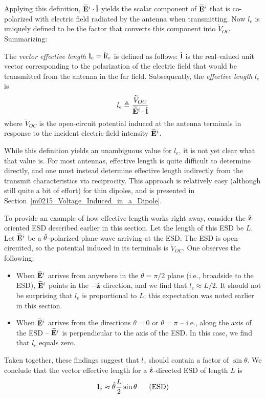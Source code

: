 Applying this definition, $\widetilde{\bf E}^i \cdot \hat{\bf l}$ yields the scalar component of $\widetilde{\bf E}^i$ that is co-polarized with electric field radiated by the antenna when transmitting. 
Now $l_e$ is uniquely defined to be the factor that converts this component into $\widetilde{V}_{OC}$.
Summarizing:
%
\begin{mdframed}[backgroundcolor=yellow!20,nobreak=true] 
The \emph{vector effective length} ${\bf l}_e = \hat{\bf l} l_e$ is defined as follows:
$\hat{\bf l}$ is the real-valued unit vector corresponding to the polarization of the electric field that would be transmitted from the antenna in the far field.
Subsequently, the \emph{effective length} $l_e$ is 
%
\begin{equation}
l_e \triangleq \frac{\widetilde{V}_{OC}}{\widetilde{\bf E}^i \cdot \hat{\bf l}} 
\end{equation}
%
where $\widetilde{V}_{OC}$ is the open-circuit potential induced at the antenna terminals in response to the incident electric field intensity $\widetilde{\bf E}^i$.
\end{mdframed}

While this definition yields an unambiguous value for $l_e$, it is not yet clear what that value is.
For most antennas, effective length is quite difficult to determine directly, and one must instead determine effective length indirectly from the transmit characteristics via reciprocity.
This approach is relatively easy (although still quite a bit of effort) for thin dipoles, and is presented in Section~\ref{m0215_Voltage_Induced_in_a_Dipole}.

To provide an example of how effective length works right away, consider the $\hat{\bf z}$-oriented ESD described earlier in this section.
Let the length of this ESD be $L$.
Let $\widetilde{\bf E}^i$ be a $\hat{\bf \theta}$-polarized plane wave arriving at the ESD.
The ESD is open-circuited, so the potential induced in its terminals is $\widetilde{V}_{OC}$.
One observes the following:
%
\begin{itemize}
\item  When $\widetilde{\bf E}^i$ arrives from anywhere in the $\theta=\pi/2$ plane (i.e., broadside to the ESD), $\widetilde{\bf E}^i$ points in the $-\hat{\bf z}$ direction, and we find that $l_e\approx L/2$.  It should not be surprising that $l_e$ is proportional to $L$; this expectation was noted earlier in this section.
\item  When $\widetilde{\bf E}^i$ arrives from the directions $\theta=0$ or $\theta=\pi$ -- i.e., along the axis of the ESD -- $\widetilde{\bf E}^i$ is perpendicular to the axis of the ESD. In this case, we find that $l_e$ equals zero. 
\end{itemize}
%
Taken together, these findings suggest that $l_e$ should contain a factor of $\sin\theta$.
We conclude that the vector effective length for a $\hat{\bf z}$-directed ESD of length $L$ is
%
\begin{equation}
{\bf l}_e \approx \hat{\bf \theta}\frac{L}{2}\sin\theta ~~~~~ \mbox{(ESD)}
\label{m0206_eVEL-ESD}
\end{equation}
 
